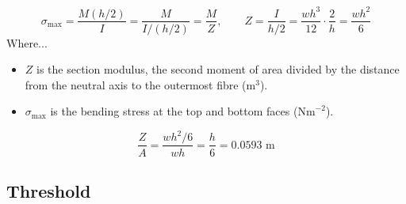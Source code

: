 \[
\sigma_{\max}=\frac{M(h/2)}{I}=\frac{M}{I/(h/2)}=\frac{M}{Z}, \qquad Z=\frac{I}{h/2}=\frac{wh^3}{12}\cdot\frac{2}{h}=\frac{wh^2}{6}
\]
Where...
\begin{itemize}
	\item $Z$ is the section modulus, the second moment of area divided by the distance from the neutral axis to the outermost fibre ($\text{m}^3$).
	\item $\sigma_{\max}$ is the bending stress at the top and bottom faces ($\text{Nm}^{-2}$).
\end{itemize}
\[
\frac{Z}{A}=\frac{wh^2/6}{wh}=\frac{h}{6}=0.0593\text{ m}
\]

\subsection{Threshold}
